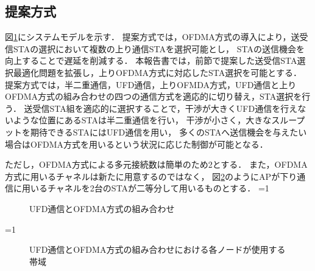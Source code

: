 \documentclass[technicalreport]{ieicej}
\newcounter{flagFig}
\begin{document}
	\subsection{提案方式}\label{sec:ufd_ofdma}
		図\ref{fig:ofdma}にシステムモデルを示す．
		提案方式では，OFDMA方式の導入により，送受信STAの選択において複数の上り通信STAを選択可能とし，
		STAの送信機会を向上することで遅延を削減する．
		本報告書では，前節で提案した送受信STA選択最適化問題を拡張し，上りOFDMA方式に対応したSTA選択を可能とする．
		提案方式では，半二重通信，UFD通信，上りOFMDA方式，UFD通信と上りOFDMA方式の組み合わせの四つの通信方式を適応的に切り替え，STA選択を行う．
		送受信STA組を適応的に選択することで，干渉が大きくUFD通信を行えないような位置にあるSTAは半二重通信を行い，
		干渉が小さく，大きなスループットを期待できるSTAにはUFD通信を用い，
		多くのSTAへ送信機会を与えたい場合はOFDMA方式を用いるという状況に応じた制御が可能となる．
		\par
		ただし，OFDMA方式による多元接続数は簡単のため2とする．
		また，OFDMA方式に用いるチャネルは新たに用意するのではなく，
		図\ref{fig:ufd_ofdma_channel}のようにAPが下り通信に用いるチャネルを2台のSTAが二等分して用いるものとする．
		\ifnum\value{flagFig}=1 {\begin{figure}[t]
			\centering
			\caption{UFD通信とOFDMA方式の組み合わせ}
			\label{fig:ofdma}
		\end{figure}}\fi
		\ifnum\value{flagFig}=1 {\begin{figure}[t]
			\centering
			\caption{UFD通信とOFDMA方式の組み合わせにおける各ノードが使用する帯域}
			\label{fig:ufd_ofdma_channel}
		\end{figure}}\fi
\end{document}
